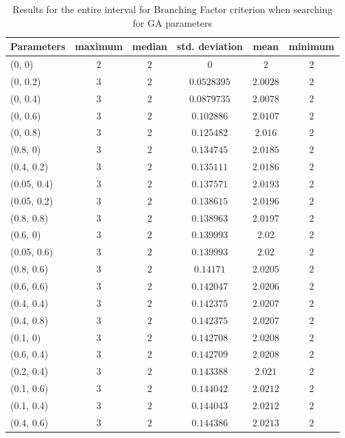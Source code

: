 \begin{center}
{\begin{longtable}{| l | c | c | c | c | c |}
\caption[ble]{Results for the entire interval for Branching Factor criterion when searching for GA parameters}\label{tabBFParameters}\\
\hline
Parameters & maximum & median & std. deviation & mean & minimum \\ \hline
\endhead
(0, 0) & $2$ & $2$ & $0$ & $2$ & $2$ \\ \hline
(0, 0.2) & $3$ & $2$ & $0.0528395$ & $2.0028$ & $2$ \\ \hline
(0, 0.4) & $3$ & $2$ & $0.0879735$ & $2.0078$ & $2$ \\ \hline
(0, 0.6) & $3$ & $2$ & $0.102886$ & $2.0107$ & $2$ \\ \hline
(0, 0.8) & $3$ & $2$ & $0.125482$ & $2.016$ & $2$ \\ \hline
(0.8, 0) & $3$ & $2$ & $0.134745$ & $2.0185$ & $2$ \\ \hline
(0.4, 0.2) & $3$ & $2$ & $0.135111$ & $2.0186$ & $2$ \\ \hline
(0.05, 0.4) & $3$ & $2$ & $0.137571$ & $2.0193$ & $2$ \\ \hline
(0.05, 0.2) & $3$ & $2$ & $0.138615$ & $2.0196$ & $2$ \\ \hline
(0.8, 0.8) & $3$ & $2$ & $0.138963$ & $2.0197$ & $2$ \\ \hline
(0.6, 0) & $3$ & $2$ & $0.139993$ & $2.02$ & $2$ \\ \hline
(0.05, 0.6) & $3$ & $2$ & $0.139993$ & $2.02$ & $2$ \\ \hline
(0.8, 0.6) & $3$ & $2$ & $0.14171$ & $2.0205$ & $2$ \\ \hline
(0.6, 0.6) & $3$ & $2$ & $0.142047$ & $2.0206$ & $2$ \\ \hline
(0.4, 0.4) & $3$ & $2$ & $0.142375$ & $2.0207$ & $2$ \\ \hline
(0.4, 0.8) & $3$ & $2$ & $0.142375$ & $2.0207$ & $2$ \\ \hline
(0.1, 0) & $3$ & $2$ & $0.142708$ & $2.0208$ & $2$ \\ \hline
(0.6, 0.4) & $3$ & $2$ & $0.142709$ & $2.0208$ & $2$ \\ \hline
(0.2, 0.4) & $3$ & $2$ & $0.143388$ & $2.021$ & $2$ \\ \hline
(0.1, 0.6) & $3$ & $2$ & $0.144042$ & $2.0212$ & $2$ \\ \hline
(0.1, 0.4) & $3$ & $2$ & $0.144043$ & $2.0212$ & $2$ \\ \hline
(0.4, 0.6) & $3$ & $2$ & $0.144386$ & $2.0213$ & $2$ \\ \hline

\end{longtable}}
\end{center}
